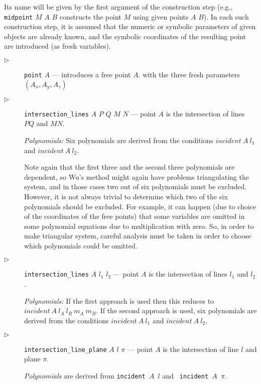 \documentclass[final,1p,times,authoryear]{elsarticle}
\begin{document}
Its name will be given by the first argument of the construction step
(e.g., {\tt midpoint} $M$ $A$ $B$ constructs the point $M$ using given
points $A$ $B$). In each such construction step, it is assumed that
the numeric or symbolic parameters of given objects are already known,
and the symbolic coordinates of the resulting point are introduced (as
fresh variables).

\begin{description}

\item[$\triangleright$] {\tt point} $A$ --- introduces a free point
  $A$.  with the three fresh parameters $(A_x, A_y, A_z)$

\item[$\triangleright$] {\tt intersection\_lines} $A$ $P$ $Q$ $M$ $N$
  --- point $A$ is the intersection of lines $PQ$ and $MN$.

{\em Polynomials:} Six polynomials are derived from the conditions
$incident\ A\ l_1$ and $incident\ A\ l_2$.

Note again that the first three and the second three polynomials are
dependent, so Wu's method might again have problems triangulating the
system, and in those cases two out of six polynomials must be
excluded. However, it is not always trivial to determine which two of
the six polynomials should be excluded. For example, it can happen
(due to choice of the coordinates of the free points) that some
variables are omitted in some polynomial equations due to
multiplication with zero. So, in order to make triangular system,
careful analysis must be taken in order to choose which polynomials
could be omitted.

\item[$\triangleright$] {\tt intersection\_lines} $A$ $l_1$ $l_2$ ---
  point $A$ is the intersection of lines $l_1$ and $l_2$.

  {\em Polynomials:} If the first approach is used then this reduces
  to $incident\ A\ l_A\ l_B\ m_A\ m_B$. If the second approach is
  used, six polynomials are derived from the conditions
  $incident\ A\ l_1$ and $incident\ A\ l_2$.


\item[$\triangleright$] {\tt intersection\_line\_plane} $A$ $l$ $\pi$ ---
  point $A$ is the intersection of line $l$ and plane $\pi$.

  {\em Polynomials} are derived from {\tt incident $A$ $l$} and {\tt
    incident $A$ $\pi$}.


\end{description}
\end{document}
